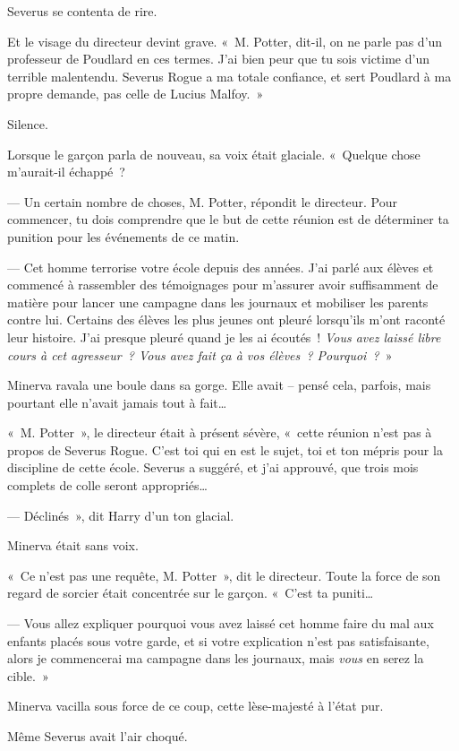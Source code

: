 Severus se contenta de rire.

Et le visage du directeur devint grave.
«~M. Potter, dit-il, on ne parle pas d'un professeur de Poudlard en ces termes.
J'ai bien peur que tu sois victime d'un terrible malentendu.
Severus Rogue a ma totale confiance, et sert Poudlard à ma propre demande, pas celle de Lucius Malfoy.~»

Silence.

Lorsque le garçon parla de nouveau, sa voix était glaciale.
«~Quelque chose m'aurait-il échappé~?

--- Un certain nombre de choses, M. Potter, répondit le directeur.
Pour commencer, tu dois comprendre que le but de cette réunion est de déterminer ta punition pour les événements de ce matin.

--- Cet homme terrorise votre école depuis des années.
J'ai parlé aux élèves et commencé à rassembler des témoignages pour m'assurer avoir suffisamment de matière pour lancer une campagne dans les journaux et mobiliser les parents contre lui.
Certains des élèves les plus jeunes ont pleuré lorsqu'ils m'ont raconté leur histoire.
J'ai presque pleuré quand je les ai écoutés~!
\emph{Vous avez laissé libre cours à cet agresseur~?
Vous avez fait ça à vos élèves~?
Pourquoi~?}~»

Minerva ravala une boule dans sa gorge.
Elle avait -- pensé cela, parfois, mais pourtant elle n'avait jamais tout à fait…

«~M. Potter~», le directeur était à présent sévère, «~cette réunion n'est pas à propos de Severus Rogue.
C'est toi qui en est le sujet, toi et ton mépris pour la discipline de cette école.
Severus a suggéré, et j'ai approuvé, que trois mois complets de colle seront appropriés…

--- Déclinés~», dit Harry d'un ton glacial.

Minerva était sans voix.

«~Ce n'est pas une requête, M. Potter~», dit le directeur.
Toute la force de son regard de sorcier était concentrée sur le garçon.
«~C'est ta puniti…

--- Vous allez expliquer pourquoi vous avez laissé cet homme faire du mal aux enfants placés sous votre garde, et si votre explication n'est pas satisfaisante, alors je commencerai ma campagne dans les journaux, mais \emph{vous} en serez la cible.~»

Minerva vacilla sous force de ce coup, cette lèse-majesté à l'état pur.

Même Severus avait l'air choqué.

